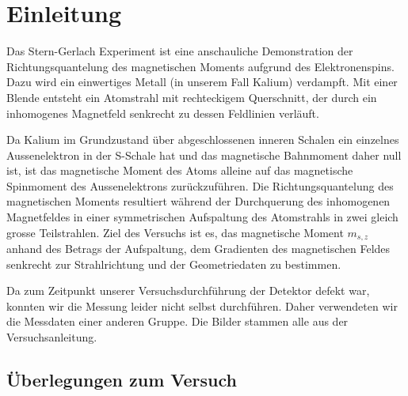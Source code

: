 \documentclass[a4paper,parskip,11pt, DIV12]{scrreprt}
\begin{document}
\fancyfoot{}
\fancyfoot[R]{\small \thepage}
\fancyfoot[L]{}
\fancyfoot[C]{}
\renewcommand{\footrulewidth}{0.4pt} 

\addtolength{\headheight}{2\baselineskip}
\addtolength{\headheight}{0.6pt}


\renewcommand{\headrulewidth}{0.6pt}
\renewcommand{\footrulewidth}{0.4pt}

\renewcommand{\chaptermark}[1]{ \markboth{#1}{} } %


\tableofcontents

\chapter{Einleitung}

Das Stern-Gerlach Experiment ist eine anschauliche Demonstration der Richtungsquantelung des magnetischen Moments aufgrund des Elektronenspins. Dazu wird ein einwertiges Metall (in unserem Fall Kalium) verdampft. Mit einer Blende entsteht ein Atomstrahl mit rechteckigem Querschnitt, der durch ein inhomogenes Magnetfeld senkrecht zu dessen Feldlinien verläuft. 
 
 Da Kalium im Grundzustand über abgeschlossenen inneren Schalen ein einzelnes Aussenelektron in der S-Schale hat und das magnetische Bahnmoment daher null ist, ist das magnetische Moment des Atoms alleine auf das magnetische Spinmoment des Aussenelektrons zurückzuführen. Die Richtungsquantelung des magnetischen Moments resultiert während der Durchquerung des inhomogenen Magnetfeldes in einer symmetrischen Aufspaltung des Atomstrahls in zwei gleich grosse Teilstrahlen. Ziel des Versuchs ist es, das magnetische Moment $m_{s,z}$ anhand des Betrags der Aufspaltung, dem Gradienten des magnetischen Feldes senkrecht zur Strahlrichtung und der Geometriedaten zu bestimmen.
 
 Da zum Zeitpunkt unserer Versuchsdurchführung der Detektor defekt war, konnten wir die Messung leider nicht selbst durchführen. Daher verwendeten wir die Messdaten einer anderen Gruppe. Die Bilder stammen alle aus der Versuchsanleitung.
 
 \section{Überlegungen zum Versuch}
 
\end{document}
